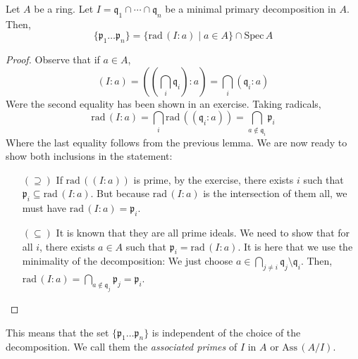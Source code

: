 \begin{theorem}
    Let $A$ be a ring.
    Let $I = \mathfrak{q}_1 \cap \cdots \cap \mathfrak{q}_n$ be a minimal primary decomposition in $A$.
    Then,
    \[\{\mathfrak{p}_1 \ldots \mathfrak{p}_n\} =
    \{\text{rad}\,(I : a) \mid a \in A\} \cap \text{Spec}\,A\]

    \begin{proof}
        Observe that if $a \in A$,
        \[(I:a) =
        \left( \left(\bigcap_i \mathfrak{q}_i\right) : a \right )
        = \bigcap_i (\mathfrak{q}_i : a)
        \]
        Were the second equality has been shown in an exercise.
        Taking radicals,
        \[
            \text{rad}\,(I:a) = \bigcap_i \text{rad}\,((\mathfrak{q}_i : a))
            = \bigcap_{a \notin \mathfrak{q}_i} \mathfrak{p}_i
        \]
        Where the last equality follows from the previous lemma.
        We are now ready to show both inclusions in the statement:

        \begin{itemize}
            \item[$(\supseteq)$]
            If $\text{rad}\,((I : a))$ is prime,
            by the exercise, there exists $i$ such that
            $\mathfrak{p}_i \subseteq \text{rad}\,(I : a)$.
            But because $\text{rad}\,(I : a)$ is the intersection of them all,
            we must have $\text{rad}\,(I : a) = \mathfrak{p}_i$.

            \item[$(\subseteq)$]
            It is known that they are all prime ideals.
            We need to show that for all $i$, there exists $a \in A$ such that
            $\mathfrak{p}_i = \text{rad}\,(I : a)$.
            It is here that we use the minimality of the decomposition:
            We just choose $a \in \bigcap_{j \neq i} \mathfrak{q}_j \setminus \mathfrak{q}_i $.
            Then, $\text{rad}\,(I : a) = \bigcap_{a \notin \mathfrak{q}_j} \mathfrak{p}_j = \mathfrak{p}_i$.


        \end{itemize}

    \end{proof}
\end{theorem}

\begin{rk}
    This means that the set $\{\mathfrak{p}_1 \ldots \mathfrak{p}_n\}$
    is independent of the choice of the decomposition.
    We call them the \emph{associated primes} of $I$ in $A$
    or $\text{Ass}\,(A/I)$.

\end{rk}

